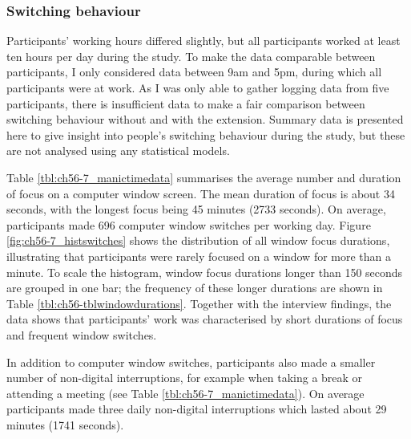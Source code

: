 \subsubsection{Switching behaviour}
Participants’ working hours differed slightly, but all participants worked at least ten hours per day during the study. To make the data comparable between participants, I only considered data between 9am and 5pm, during which all participants were at work. As I was only able to gather logging data from five participants, there is insufficient data to make a fair comparison between switching behaviour without and with the extension. Summary data is presented here to give insight into people's switching behaviour during the study, but these are not analysed using any statistical models.

Table \ref{tbl:ch56-7_manictimedata} summarises the average number and duration of focus on a computer window screen. The mean duration of focus is about 34 seconds, with the longest focus being 45 minutes (2733 seconds). On average, participants made 696  computer window switches per working day. Figure \ref{fig:ch56-7_histswitches} shows the distribution of all window focus durations, illustrating that participants were rarely focused on a window for more than a minute. To scale the histogram, window focus durations longer than 150 seconds are grouped in one bar; the frequency of these longer durations are shown in Table \ref{tbl:ch56-tblwindowdurations}. %
Together with the interview findings, the data shows that participants’ work was characterised by short durations of focus and frequent window switches. %

In addition to computer window switches, participants also made a smaller number of non-digital interruptions, for example when taking a break or attending a meeting (see Table \ref{tbl:ch56-7_manictimedata}). On average participants made three daily non-digital interruptions which lasted about 29 minutes (1741 seconds). 

